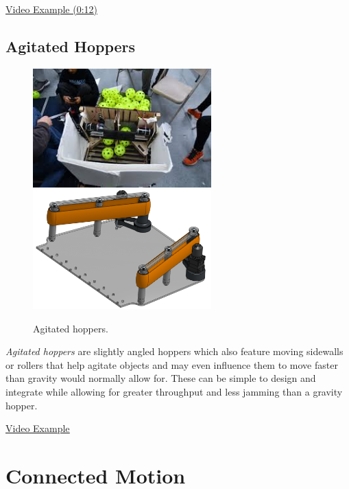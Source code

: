 \href{https://youtu.be/ewTCvLp5EUo?t=12}{\color{red}\underline{Video Example (0:12)}}
\subsection{Agitated Hoppers}

\begin{figure}[H]
	\includegraphics[height=1.8in]{imgs/hopper_agitated_1.jpeg}
	\includegraphics[height=1.8in]{imgs/hopper_agitated_2.png}
	\caption{Agitated hoppers.}
\end{figure}

\textit{Agitated hoppers} are slightly angled hoppers which also feature moving sidewalls or rollers that help agitate objects and may even influence them to move faster than gravity would normally allow for. These can be simple to design and integrate while allowing for greater throughput and less jamming than a gravity hopper. 

\href{https://www.youtube.com/watch?v=9vIrTnXu7ho}{\color{red}\underline{Video Example}}
\section{Connected Motion}

